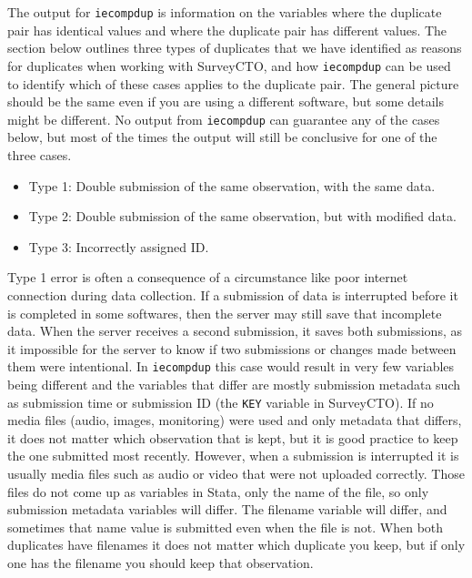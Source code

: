 \documentclass{tufte-handout}
\begin{document}
The output for \texttt{iecompdup} is information on the variables where the duplicate pair
has identical values and where the duplicate pair has different values.
The section below outlines three types of duplicates that we have identified
as reasons for duplicates when working with SurveyCTO, and how \texttt{iecompdup}
can be used to identify which of these cases applies to the duplicate pair.
The general picture should be the same even if you are using a different software,
but some details might be different. No output from \texttt{iecompdup}
can guarantee any of the cases below, but most of the times the output
will still be conclusive for one of the three cases.

\begin{itemize}
    \item Type 1: Double submission of the same observation, with the same data.
    \item Type 2: Double submission of the same observation, but with modified data.
    \item Type 3: Incorrectly assigned ID.
\end{itemize}


Type 1 error is often a consequence of a circumstance like poor internet connection during data collection.
If a submission of data is interrupted before it is completed in some softwares,
then the server may still save that incomplete data.
When the server receives a second submission, it saves both submissions,
as it impossible for the server to know if two submissions
or changes made between them were intentional.
In \texttt{iecompdup} this case would result in very few variables being different
and the variables that differ are mostly submission metadata such as submission time
or submission ID (the \texttt{KEY} variable in SurveyCTO).
If no media files (audio, images, monitoring) were used and only metadata that differs,
it does not matter which observation that is kept,
but it is good practice to keep the one submitted most recently.
However, when a submission is interrupted it is usually media files such as audio or video
that were not uploaded correctly. Those files do not come up as variables in Stata,
only the name of the file, so only submission metadata variables will differ.
The filename variable will differ, and sometimes that name value is submitted
even when the file is not. When both duplicates have filenames it
does not matter which duplicate you keep, but if only one has the filename
you should keep that observation.
\end{document}
